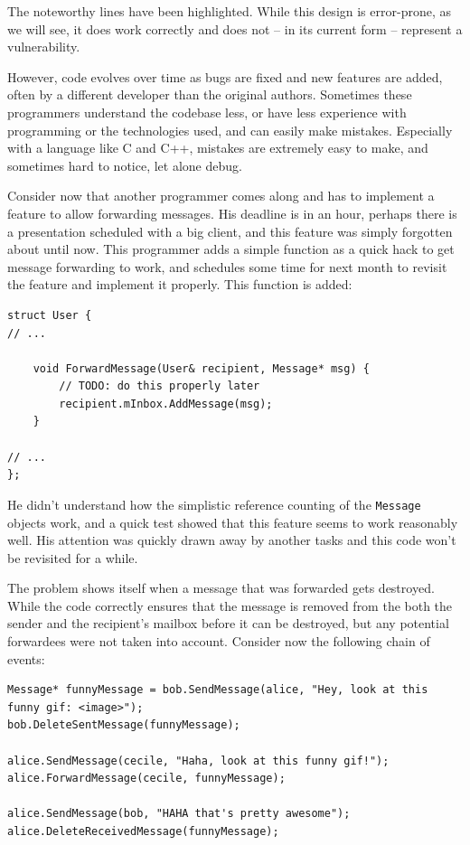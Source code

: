 The noteworthy lines have been highlighted. While this design is error-prone, as we will see, it does work correctly and does not -- in its current form -- represent a vulnerability.

However, code evolves over time as bugs are fixed and new features are added, often by a different developer than the original authors. Sometimes these programmers understand the codebase less, or have less experience with programming or the technologies used, and can easily make mistakes. Especially with a language like C and C++, mistakes are extremely easy to make, and sometimes hard to notice, let alone debug.

Consider now that another programmer comes along and has to implement a feature to allow forwarding messages. His deadline is in an hour, perhaps there is a presentation scheduled with a big client, and this feature was simply forgotten about until now. This programmer adds a simple function as a quick hack to get message forwarding to work, and schedules some time for next month to revisit the feature and implement it properly. This function is added:

\begin{lstlisting}
struct User {
// ...

	void ForwardMessage(User& recipient, Message* msg) {
		// TODO: do this properly later
		recipient.mInbox.AddMessage(msg);
	}

// ...
};
\end{lstlisting}

He didn't understand how the simplistic reference counting of the \lstinline!Message! objects work, and a quick test showed that this feature seems to work reasonably well. His attention was quickly drawn away by another tasks and this code won't be revisited for a while.

The problem shows itself when a message that was forwarded gets destroyed. While the code correctly ensures that the message is removed from the both the sender and the recipient's mailbox before it can be destroyed, but any potential forwardees were not taken into account. Consider now the following chain of events:

\begin{lstlisting}
Message* funnyMessage = bob.SendMessage(alice, "Hey, look at this funny gif: <image>");
bob.DeleteSentMessage(funnyMessage);

alice.SendMessage(cecile, "Haha, look at this funny gif!");
alice.ForwardMessage(cecile, funnyMessage);

alice.SendMessage(bob, "HAHA that's pretty awesome");
alice.DeleteReceivedMessage(funnyMessage);
\end{lstlisting}

